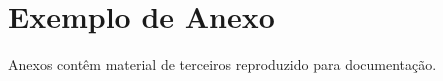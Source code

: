 \annex

\chapter{Exemplo de Anexo}

Anexos contêm material de terceiros reproduzido para documentação.